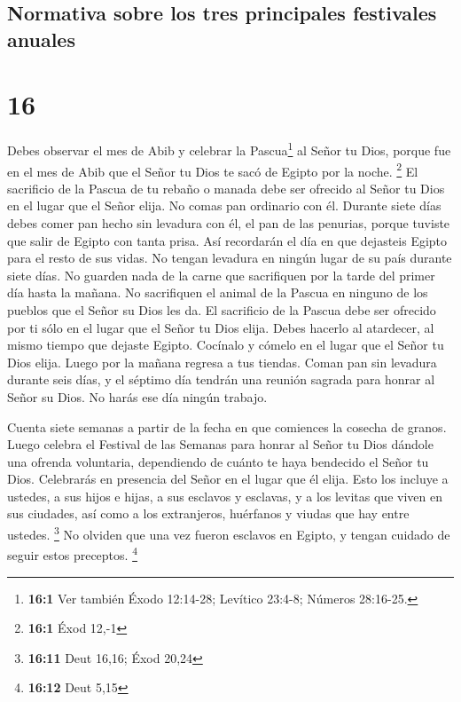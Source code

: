 \hypertarget{normativa-sobre-los-tres-principales-festivales-anuales}{%
\subsection{Normativa sobre los tres principales festivales
anuales}\label{normativa-sobre-los-tres-principales-festivales-anuales}}

\hypertarget{section-15}{%
\section{16}\label{section-15}}

 Debes observar el mes de Abib y celebrar la
Pascua\footnote{\textbf{16:1} Ver también Éxodo 12:14-28; Levítico
  23:4-8; Números 28:16-25.} al Señor tu Dios, porque fue en el mes de
Abib que el Señor tu Dios te sacó de Egipto por la noche. \footnote{\textbf{16:1}
  Éxod 12,-1}  El sacrificio de la Pascua de tu rebaño o
manada debe ser ofrecido al Señor tu Dios en el lugar que el Señor
elija.  No comas pan ordinario con él. Durante siete días
debes comer pan hecho sin levadura con él, el pan de las penurias,
porque tuviste que salir de Egipto con tanta prisa. Así recordarán el
día en que dejasteis Egipto para el resto de sus vidas. 
No tengan levadura en ningún lugar de su país durante siete días. No
guarden nada de la carne que sacrifiquen por la tarde del primer día
hasta la mañana.  No sacrifiquen el animal de la Pascua en
ninguno de los pueblos que el Señor su Dios les da.  El
sacrificio de la Pascua debe ser ofrecido por ti sólo en el lugar que el
Señor tu Dios elija. Debes hacerlo al atardecer, al mismo tiempo que
dejaste Egipto.  Cocínalo y cómelo en el lugar que el
Señor tu Dios elija. Luego por la mañana regresa a tus tiendas.
 Coman pan sin levadura durante seis días, y el séptimo
día tendrán una reunión sagrada para honrar al Señor su Dios. No harás
ese día ningún trabajo.

 Cuenta siete semanas a partir de la fecha en que
comiences la cosecha de granos.  Luego celebra el
Festival de las Semanas para honrar al Señor tu Dios dándole una ofrenda
voluntaria, dependiendo de cuánto te haya bendecido el Señor tu Dios.
 Celebrarás en presencia del Señor en el lugar que él
elija. Esto los incluye a ustedes, a sus hijos e hijas, a sus esclavos y
esclavas, y a los levitas que viven en sus ciudades, así como a los
extranjeros, huérfanos y viudas que hay entre ustedes. \footnote{\textbf{16:11}
  Deut 16,16; Éxod 20,24}  No olviden que una vez fueron
esclavos en Egipto, y tengan cuidado de seguir estos preceptos.
\footnote{\textbf{16:12} Deut 5,15}

